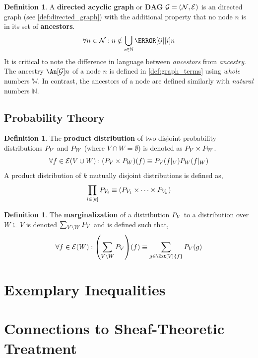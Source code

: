 \documentclass[aps, 10pt, english, twoside, pra, nofootinbib, longbibliography]{revtex4-1}
\theoremstyle{plain}
\theoremstyle{definition}
\newtheorem{definition}[theorem]{Definition}
\theoremstyle{remark}
\newcommand{\graph}{\mathcal{G}}
\newcommand{\nodes}{\mathcal{N}}
\newcommand{\edges}{\mathcal{E}}
\newcommand{\term}[1]{\textcolor{Mahogany}{\textbf{#1}}}
\newcommand{\tcdot}{} %
\newcommand{\Events}[1]{\s{E}\br{#1}} %
\begin{document}
    \begin{definition}
        \label{def:dag}
        A \term{directed acyclic graph} or \term{DAG} $\graph = \br{\nodes, \edges}$ is an directed graph (see \cref{def:directed_graph}) with the additional property that no node $n$ is in its set of \term{ancestors}.
        \[ \forall n \in \nodes : n \notin \bigcup_{i\in\mathbb{N}} \Pa[\graph][i]{n}\]
        It is critical to note the difference in language between \textit{ancestors} from \textit{ancestry}. The ancestry $\An[\graph]{n}$ of a node $n$ is defined in \cref{def:graph_terms} using \textit{whole} numbers $\mathbb{W}$. In contrast, the ancestors of a node are defined similarly with \textit{natural} numbers $\mathbb{N}$.
    \end{definition}

    \subsection{Probability Theory}

    \begin{definition}
        The \term{product distribution} of two disjoint probability distributions $\prob[V]$ and $\prob[W]$ (where $V \cap W = \emptyset$) is denoted as $\prob[V] \times \prob[W]$.
        \[ \forall f \in \Events{V \cup W} : \br{\prob[V] \times \prob[W]}\br{f} \defined \prob[V][f|_{V}]\tcdot\prob[W][f|_{W}] \]
        A product distribution of $k$ mutually disjoint distributions is defined as,
        \[ \prod_{i\in\bs{k}} \prob[V_i] \defined \br{\prob[V_1] \times \cdots \times \prob[V_k]} \]
    \end{definition}

    \begin{definition}
        The \term{marginalization} of a distribution $\prob[V]$ to a distribution over $W \subseteq V$ is denoted $\sum_{V \setminus W} \prob[V]$ and is defined such that,
        \[ \forall f \in \Events{W} : \br{\sum_{V \setminus W} \prob[V]}\br{f} \defined \sum_{g \in \Ext[V]{f}} \prob[V][g] \]
    \end{definition}

    \section{Exemplary Inequalities}
    \section{Connections to Sheaf-Theoretic Treatment}
\end{document}
